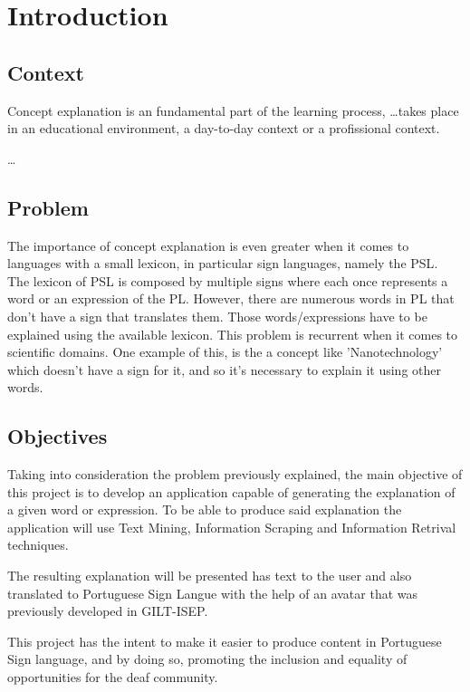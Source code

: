 % 
\chapter{Introduction} %
\label{chap:Chapter1} %

\section{Context}

Concept explanation is an fundamental part of the learning process, \dots takes place in an educational environment, a day-to-day context or a profissional context.

\dots

\section{Problem}

The importance of concept explanation is even greater when it comes to languages with a small lexicon, in particular sign languages, namely the \gls{PSL}.
The lexicon of \gls{PSL} is composed by multiple signs where each once represents a word or an expression of the \gls{PL}.
However, there are numerous words in \gls{PL} that don't have a sign that translates them.
Those words/expressions have to be explained using the available lexicon.
This problem is recurrent when it comes to scientific domains.
One example of this, is the a concept like 'Nanotechnology' which doesn't have a sign for it, and so it's necessary to explain it using other words.

\section{Objectives}

Taking into consideration the problem previously explained, the main objective of this project is to develop an application capable of generating the explanation of a given word or expression.
To be able to produce said explanation the application will use Text Mining, Information Scraping and Information Retrival techniques.

The resulting explanation will be presented has text to the user and also translated to Portuguese Sign Langue with the help of an avatar that was previously developed in GILT-ISEP.

This project has the intent to make it easier to produce content in Portuguese Sign language, and by doing so, promoting the inclusion and equality of opportunities for the deaf community. 


